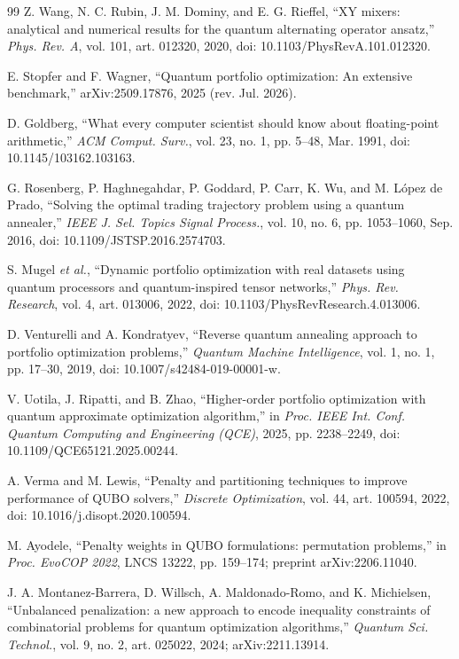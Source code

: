 \documentclass{ieeeaccess}
\begin{document}
\begin{thebibliography}{99}
 Z. Wang, N. C. Rubin, J. M. Dominy, and E. G. Rieffel, ``XY mixers: analytical and numerical results for the quantum alternating operator ansatz,'' \textit{Phys. Rev. A}, vol. 101, art. 012320, 2020, doi: 10.1103/PhysRevA.101.012320.

 E. Stopfer and F. Wagner, ``Quantum portfolio optimization: An extensive benchmark,'' arXiv:2509.17876, 2025 (rev. Jul. 2026).

 D. Goldberg, ``What every computer scientist should know about floating-point arithmetic,'' \textit{ACM Comput. Surv.}, vol. 23, no. 1, pp. 5--48, Mar. 1991, doi: 10.1145/103162.103163.

 G. Rosenberg, P. Haghnegahdar, P. Goddard, P. Carr, K. Wu, and M. L\'{o}pez de Prado, ``Solving the optimal trading trajectory problem using a quantum annealer,'' \textit{IEEE J. Sel. Topics Signal Process.}, vol. 10, no. 6, pp. 1053--1060, Sep. 2016, doi: 10.1109/JSTSP.2016.2574703.

 S. Mugel \textit{et al.}, ``Dynamic portfolio optimization with real datasets using quantum processors and quantum-inspired tensor networks,'' \textit{Phys. Rev. Research}, vol. 4, art. 013006, 2022, doi: 10.1103/PhysRevResearch.4.013006.

 D. Venturelli and A. Kondratyev, ``Reverse quantum annealing approach to portfolio optimization problems,'' \textit{Quantum Machine Intelligence}, vol. 1, no. 1, pp. 17--30, 2019, doi: 10.1007/s42484-019-00001-w.

 V. Uotila, J. Ripatti, and B. Zhao, ``Higher-order portfolio optimization with quantum approximate optimization algorithm,'' in \textit{Proc. IEEE Int. Conf. Quantum Computing and Engineering (QCE)}, 2025, pp. 2238--2249, doi: 10.1109/QCE65121.2025.00244.

 A. Verma and M. Lewis, ``Penalty and partitioning techniques to improve performance of QUBO solvers,'' \textit{Discrete Optimization}, vol. 44, art. 100594, 2022, doi: 10.1016/j.disopt.2020.100594.

 M. Ayodele, ``Penalty weights in QUBO formulations: permutation problems,'' in \textit{Proc. EvoCOP 2022}, LNCS 13222, pp. 159--174; preprint arXiv:2206.11040.

 J. A. Montanez-Barrera, D. Willsch, A. Maldonado-Romo, and K. Michielsen, ``Unbalanced penalization: a new approach to encode inequality constraints of combinatorial problems for quantum optimization algorithms,'' \textit{Quantum Sci. Technol.}, vol. 9, no. 2, art. 025022, 2024; arXiv:2211.13914.


\end{thebibliography}
\end{document}
